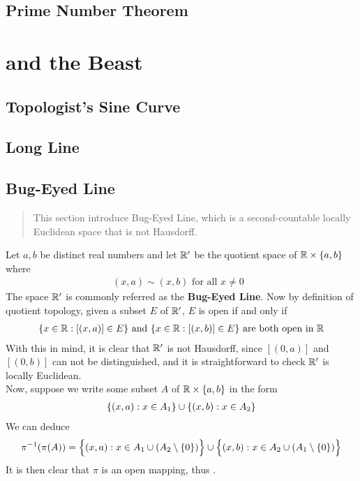 \documentclass{report}
\begin{document}
\section{Prime Number Theorem}


\chapter{and the Beast}
\section{Topologist's Sine Curve}
\label{Topologist's Sine Curve}
\section{Long Line}
\label{Long Line}
\section{Bug-Eyed Line}
\label{Bug-Eyed Line}
\begin{abstract}
This section introduce Bug-Eyed Line, which is a second-countable locally Euclidean space that is not Hausdorff.
\end{abstract}
\begin{mdframed}
Let $a,b$ be distinct real numbers and let $\mathbb{R}'$ be the quotient space of $\mathbb{R}\times \{ a,b \}$ where 
\begin{align*}
  (x,a)\sim (x,b)\text{ for all $x\neq 0$ }
\end{align*}
The space $\mathbb{R}'$ is commonly referred as the  \textbf{Bug-Eyed Line}. Now by definition of quotient topology, given a subset $E$ of  $\mathbb{R}'$, $E $ is open if and only if 
\begin{align*}
  \{ x\in\mathbb{R}:[(x,a)]\in E \}\text{ and }\{ x\in\mathbb{R}:[(x,b)]\in E \}\text{ are both open in }\mathbb{R}
\end{align*}
With this in mind, it is clear that $\mathbb{R}'$ is not Hausdorff, since  $[(0,a)]$ and $[(0,b)]$ can not be distinguished, and it is straightforward to check $\mathbb{R}'$ is locally Euclidean.\\


Now, suppose we write some subset $A$ of $\mathbb{R}\times \{ a,b \}$ in the form  
\begin{align*}
\{ (x,a):x \in A_1 \}\cup  \{ (x,b):x \in A_2 \}
\end{align*}
We can deduce
\begin{align*}
\pi^{-1}(\pi (A))=\Big\{ (x,a): x\in A_1 \cup (A_2\setminus \{ 0 \}) \Big\}\cup  \Big\{ (x,b):x \in A_2 \cup  (A_1\setminus \{ 0 \}) \Big\}
\end{align*}
It is then clear that $\pi$ is an open mapping, thus .
\end{mdframed}
\end{document}
